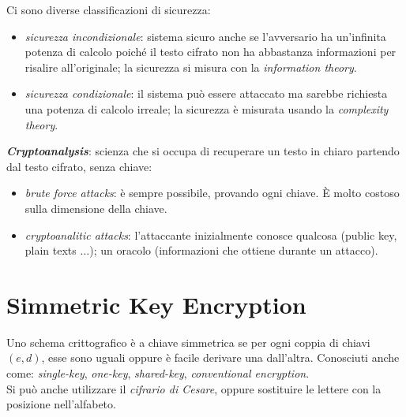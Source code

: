 \documentclass[11pt, a4paper, twoside, italian]{report}
\theoremstyle{plain}
\begin{document}
\noindent
Ci sono diverse classificazioni di sicurezza:
\begin{itemize}
	\item \textit{sicurezza incondizionale}: sistema sicuro anche se l'avversario ha un'infinita potenza di calcolo poiché il testo cifrato non ha abbastanza informazioni per risalire all'originale; la sicurezza si misura con la \textit{information theory}.
	\item \textit{sicurezza condizionale}: il sistema può essere attaccato ma sarebbe richiesta una potenza di calcolo irreale; la sicurezza è misurata usando la \textit{complexity theory}.
\end{itemize}

\noindent
\textit{\textbf{Cryptoanalysis}}: scienza che si occupa di recuperare un testo in chiaro partendo dal testo cifrato, senza chiave:
\begin{itemize}
	\item \textit{brute force attacks}: è sempre possibile, provando ogni chiave. È molto costoso sulla dimensione della chiave.
	\item \textit{cryptoanalitic attacks}: l'attaccante inizialmente conosce qualcosa (public key, plain texts $\dots$); un oracolo (informazioni che ottiene durante un attacco).
\end{itemize}


\section*{Simmetric Key Encryption}
Uno schema crittografico è a chiave simmetrica se per ogni coppia di chiavi $(e, d)$, esse sono uguali oppure è facile derivare una dall'altra. Conosciuti anche come: \textit{single-key}, \textit{one-key}, \textit{shared-key}, \textit{conventional encryption}.\\
Si può anche utilizzare il \textit{cifrario di Cesare}, oppure sostituire le lettere con la posizione nell'alfabeto.
\end{document}
